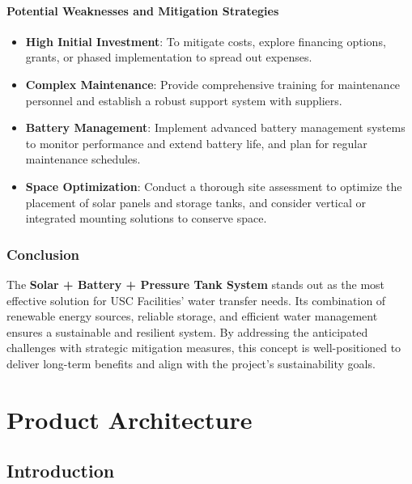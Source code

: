 \documentclass[12pt]{report}
\begin{document}
\subsubsection{Potential Weaknesses and Mitigation Strategies}
\begin{itemize}
    \item \textbf{High Initial Investment}: To mitigate costs, explore financing options, grants, or phased implementation to spread out expenses.
    \item \textbf{Complex Maintenance}: Provide comprehensive training for maintenance personnel and establish a robust support system with suppliers.
    \item \textbf{Battery Management}: Implement advanced battery management systems to monitor performance and extend battery life, and plan for regular maintenance schedules.
    \item \textbf{Space Optimization}: Conduct a thorough site assessment to optimize the placement of solar panels and storage tanks, and consider vertical or integrated mounting solutions to conserve space.
\end{itemize}

\subsection{Conclusion}

The \textbf{Solar + Battery + Pressure Tank System} stands out as the most effective solution for USC Facilities' water transfer needs. Its combination of renewable energy sources, reliable storage, and efficient water management ensures a sustainable and resilient system. By addressing the anticipated challenges with strategic mitigation measures, this concept is well-positioned to deliver long-term benefits and align with the project's sustainability goals.


\chapter{Product Architecture}
\section{Introduction}
\label{sec:introduction}
\end{document}
